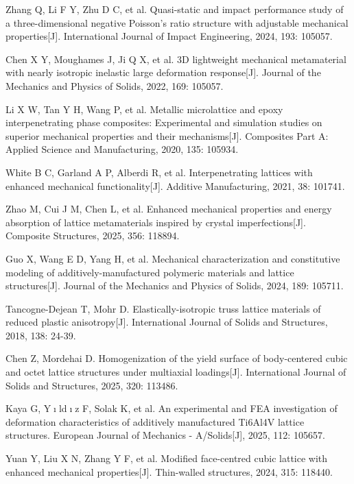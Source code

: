 \documentclass{article} %
\begin{document}
\noindent [14] Zhang Q, Li F Y, Zhu D C, et al. Quasi-static and impact performance study of a three-dimensional negative Poisson's ratio structure with adjustable mechanical properties[J]. International Journal of Impact Engineering, 2024, 193: 105057.

\noindent [15] Chen X Y, Moughames J, Ji Q X, et al. 3D lightweight mechanical metamaterial with nearly isotropic inelastic large deformation response[J]. Journal of the Mechanics and Physics of Solids, 2022, 169: 105057.

\noindent [16] Li X W, Tan Y H, Wang P, et al. Metallic microlattice and epoxy interpenetrating phase composites: Experimental and simulation studies on superior mechanical properties and their mechanisms[J]. Composites Part A: Applied Science and Manufacturing, 2020, 135: 105934.

\noindent [17] White B C, Garland A P, Alberdi R, et al. Interpenetrating lattices with enhanced mechanical functionality[J]. Additive Manufacturing, 2021, 38: 101741.

\noindent [18] Zhao M, Cui J M, Chen L, et al. Enhanced mechanical properties and energy absorption of lattice metamaterials inspired by crystal imperfections[J]. Composite Structures, 2025, 356: 118894.

\noindent [19] Guo X, Wang E D, Yang H, et al. Mechanical characterization and constitutive modeling of additively-manufactured polymeric materials and lattice structures[J]. Journal of the Mechanics and Physics of Solids, 2024, 189: 105711.

\noindent [20] Tancogne-Dejean T, Mohr D. Elastically-isotropic truss lattice materials of reduced plastic anisotropy[J]. International Journal of Solids and Structures, 2018, 138: 24-39.

\noindent [21] Chen Z, Mordehai D. Homogenization of the yield surface of body-centered cubic and octet lattice structures under multiaxial loadings[J]. International Journal of Solids and Structures, 2025, 320: 113486.

\noindent [22] Kaya G, Y$\mathrm{\imath}$ld$\mathrm{\imath}$z F, Solak K, et al. An experimental and FEA investigation of deformation characteristics of additively manufactured Ti6Al4V lattice structures. European Journal of Mechanics - A/Solids[J], 2025, 112: 105657.

\noindent [23] Yuan Y, Liu X N, Zhang Y F, et al. Modified face-centred cubic lattice with enhanced mechanical properties[J]. Thin-walled structures, 2024, 315: 118440.
\end{document}
